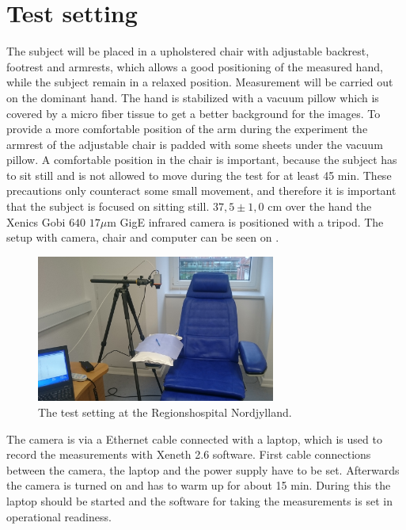 \section{Test setting}

The subject will be placed in a upholstered chair with adjustable backrest, footrest and armrests, which allows a good positioning of the measured hand, while the subject remain in a relaxed position. Measurement will be carried out on the dominant hand. The hand is stabilized with a vacuum pillow which is covered by a micro fiber tissue to get a better background for the images. To provide a more comfortable position of the arm during the experiment the armrest of the adjustable chair is padded with some sheets under the vacuum pillow. A comfortable position in the chair is important, because the subject has to sit still and is not allowed to move during the test for at least 45 min. These precautions only counteract some small movement, and therefore it is important that the subject is focused on sitting still. 
$37,5\pm 1,0$ cm over the hand the Xenics Gobi $640$ $17\mu$m GigE infrared camera is positioned with a tripod. The setup with camera, chair and computer can be seen on . 


\begin{figure}[H]
	\includegraphics[width=0.7\textwidth]{figures/setting}
	\caption{The test setting at the Regionshospital Nordjylland.}
	\label{fig:setting}
\end{figure}

The camera is via a Ethernet cable connected with a laptop, which is used to record the measurements with Xeneth 2.6 software. 
First cable connections between the camera, the laptop and the power supply have to be set. Afterwards the camera is turned on and has to warm up for about 15 min. During this the laptop should be started and the software for taking the measurements is set in operational readiness.

